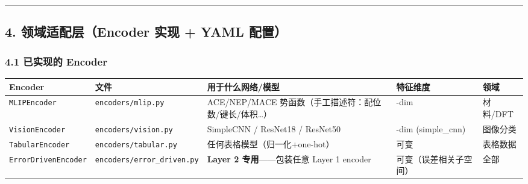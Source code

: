 \documentclass[
  12pt,
]{ctexart}
\begin{document}
\begin{center}\rule{0.5\linewidth}{0.5pt}\end{center}

\subsection{4. 领域适配层（Encoder 实现 + YAML
配置）}\label{ux9886ux57dfux9002ux914dux5c42encoder-ux5b9eux73b0-yaml-ux914dux7f6e}

\subsubsection{4.1 已实现的
Encoder}\label{ux5df2ux5b9eux73b0ux7684-encoder}

\begin{longtable}[]{@{}
  >{\raggedright\arraybackslash}p{}
  >{\raggedright\arraybackslash}p{}
  >{\raggedright\arraybackslash}p{}
  >{\raggedright\arraybackslash}p{}
  >{\raggedright\arraybackslash}p{}@{}}
\toprule\noalign{}
\begin{minipage}[b]{\linewidth}\raggedright
Encoder
\end{minipage} & \begin{minipage}[b]{\linewidth}\raggedright
文件
\end{minipage} & \begin{minipage}[b]{\linewidth}\raggedright
用于什么网络/模型
\end{minipage} & \begin{minipage}[b]{\linewidth}\raggedright
特征维度
\end{minipage} & \begin{minipage}[b]{\linewidth}\raggedright
领域
\end{minipage} \\
\midrule\noalign{}
\endhead
\bottomrule\noalign{}
\endlastfoot
\texttt{MLIPEncoder} & \texttt{encoders/mlip.py} & ACE/NEP/MACE
势函数（手工描述符：配位数/键长/体积\ldots） & 12-dim & 材料/DFT \\
\texttt{VisionEncoder} & \texttt{encoders/vision.py} & SimpleCNN /
ResNet18 / ResNet50 & 256-dim (simple\_cnn) & 图像分类 \\
\texttt{TabularEncoder} & \texttt{encoders/tabular.py} &
任何表格模型（归一化+one-hot） & 可变 & 表格数据 \\
\texttt{ErrorDrivenEncoder} & \texttt{encoders/error\_driven.py} &
\textbf{Layer 2 专用}------包装任意 Layer 1 encoder &
可变（误差相关子空间） & 全部 \\
\end{longtable}
\end{document}
